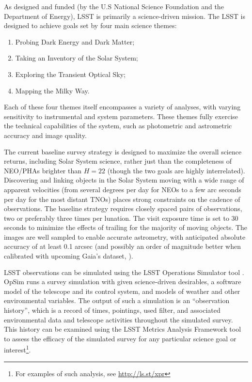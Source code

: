 As designed and funded (by the U.S National Science Foundation and
the Department of Energy), LSST is primarily a science-driven mission.
The LSST is designed to achieve goals set by four main science themes:
\begin{enumerate}
\item Probing Dark Energy and Dark Matter;
\item Taking an Inventory of the Solar System;
\item Exploring the Transient Optical Sky;
\item Mapping the Milky Way.
\end{enumerate}
Each of these four themes itself encompasses a variety of analyses, with
varying sensitivity to instrumental and system parameters. These themes
fully exercise the technical capabilities of the system, such as photometric
and astrometric accuracy and image quality.

The current baseline survey strategy is designed to maximize the overall science returns, including
Solar System science, rather just than the completeness of NEO/PHAs brighter than $H=22$ (though the
two goals are highly interrelated). Discovering and linking objects in the Solar System
moving with a wide range of apparent velocities (from several degrees per day for
NEOs to a few arc seconds per day for the most distant TNOs) places strong
constraints on the cadence of observations. The baseline strategy requires closely
spaced pairs of observations, two or preferably three times per lunation. The visit
exposure time is set to 30 seconds to minimize the effects of trailing for the majority of
moving objects. The images are well sampled to enable accurate astrometry, with
anticipated absolute accuracy of at least 0.1 arcsec (and possibly an order of magnitude
better when calibrated with upcoming Gaia's dataset, \citealt{Gaia}).

LSST observations can be simulated using the LSST Operations Simulator tool
\citep[OpSim,][]{delgado14}. OpSim runs a survey simulation with given
science-driven desirables,  a software model of the telescope and its control
system, and models of weather and other  environmental variables. The output of
such a simulation is an ``observation history'', which  is a record of times,
pointings, used filter, and associated environmental data and telescope
activities throughout the simulated survey.  This history can be examined using
the LSST  Metrics Analysis Framework tool \citep[MAF,][]{jones14} to assess the
efficacy of the simulated survey for any particular science goal or
interest\footnote{For examples of such analysis, see \url{http://ls.st/xpr}}.


